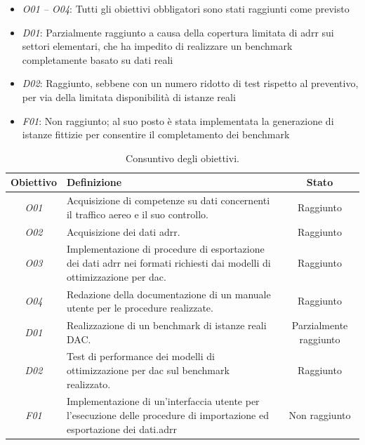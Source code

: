 \begin{itemize}
    \item \textit{O01 – O04}: Tutti gli obiettivi obbligatori sono stati raggiunti come previsto
    \item \textit{D01}: Parzialmente raggiunto a causa della copertura limitata di \gls{adrr} sui settori elementari, che ha impedito di realizzare un benchmark completamente basato su dati reali
    \item \textit{D02}: Raggiunto, sebbene con un numero ridotto di test rispetto al preventivo, per via della limitata disponibilità di istanze reali
    \item \textit{F01}: Non raggiunto; al suo posto è stata implementata la generazione di istanze fittizie per consentire il completamento dei benchmark
\end{itemize}
\clearpage
    \begin{table}[htbp]
\begin{tabularx}{\textwidth}{!{\vrule}c!{\vrule}X!{\vrule}c!{\vrule}}
\hline
\textbf{Obiettivo} & \textbf{Definizione} & \textbf{Stato} \\\hline
\textit{O01} & Acquisizione di competenze su dati concernenti il traffico aereo e il suo controllo. & Raggiunto \\
\textit{O02} & Acquisizione dei dati \gls{adrr}. & Raggiunto \\
\textit{O03} & Implementazione di procedure di esportazione dei dati \gls{adrr} nei formati richiesti dai modelli di ottimizzazione per \gls{dac}. & Raggiunto \\
\textit{O04} & Redazione della documentazione di un manuale utente per le procedure realizzate. & Raggiunto \\
\hline
\textit{D01} & Realizzazione di un benchmark di istanze reali DAC. & Parzialmente raggiunto \\
\textit{D02} & Test di performance dei modelli di ottimizzazione per \acrshort{dac} sul benchmark realizzato. & Raggiunto \\
\hline
\textit{F01} & Implementazione di un'interfaccia utente per l'esecuzione delle procedure di importazione ed esportazione dei dati.\gls{adrr} & Non raggiunto \\
\hline
\end{tabularx}
\caption{Consuntivo degli obiettivi.}
\label{tab:consuntivo-obiettivi}
\end{table}
   



